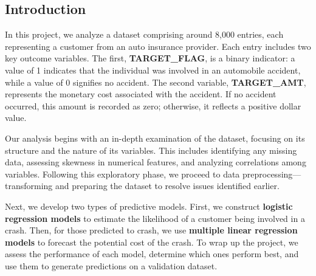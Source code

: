 \documentclass[
]{article}
\begin{document}
\subsection{Introduction}\label{introduction}

In this project, we analyze a dataset comprising around 8,000 entries,
each representing a customer from an auto insurance provider. Each entry
includes two key outcome variables. The first, \textbf{TARGET\_FLAG}, is
a binary indicator: a value of 1 indicates that the individual was
involved in an automobile accident, while a value of 0 signifies no
accident. The second variable, \textbf{TARGET\_AMT}, represents the
monetary cost associated with the accident. If no accident occurred,
this amount is recorded as zero; otherwise, it reflects a positive
dollar value.

Our analysis begins with an in-depth examination of the dataset,
focusing on its structure and the nature of its variables. This includes
identifying any missing data, assessing skewness in numerical features,
and analyzing correlations among variables. Following this exploratory
phase, we proceed to data preprocessing---transforming and preparing the
dataset to resolve issues identified earlier.

Next, we develop two types of predictive models. First, we construct
\textbf{logistic regression models} to estimate the likelihood of a
customer being involved in a crash. Then, for those predicted to crash,
we use \textbf{multiple linear regression models} to forecast the
potential cost of the crash. To wrap up the project, we assess the
performance of each model, determine which ones perform best, and use
them to generate predictions on a validation dataset.
\end{document}
